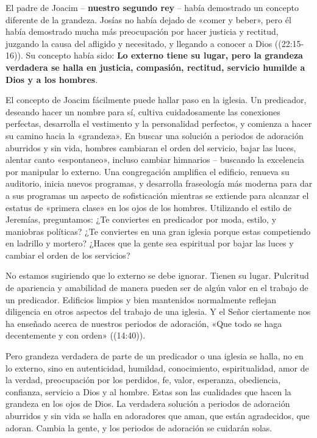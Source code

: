 \documentclass[12pt, twoside, openright]{book}
\begin{document}
El padre de Joacim – \textbf{nuestro segundo rey} – había demostrado un concepto diferente de la grandeza. Josías no había dejado de «comer y beber», pero él había demostrado mucha más preocupación por hacer justicia y rectitud, juzgando la causa del afligido y necesitado, y llegando a conocer a Dios ((22:15-16)). Su concepto había sido: \textbf{Lo externo tiene su lugar, pero la grandeza verdadera se halla en justicia, compasión, rectitud, servicio humilde a Dios y a los hombres}. 

El concepto de Joacim fácilmente puede hallar paso en la iglesia. Un predicador, deseando hacer un nombre para sí, cultiva cuidadosamente las conexiones perfectas, desarrolla el vestimento y la personalidad perfectos, y comienza a hacer su camino hacia la «grandeza». En buscar una solución a periodos de adoración aburridos y sin vida, hombres cambiaran el orden del servicio, bajar las luces, alentar canto «espontaneo», incluso cambiar himnarios – buscando la excelencia por manipular lo externo. Una congregación amplifica el edificio, renueva su auditorio, inicia nuevos programas, y desarrolla fraseología más moderna para dar a sus programas un aspecto de sofisticación mientras se extiende para alcanzar el estatus de «primera clase» en los ojos de los hombres. Utilizando el estilo de Jeremías, preguntamos: ¿Te conviertes en predicador por moda, estilo, y maniobras políticas? ¿Te conviertes en una gran iglesia porque estas competiendo en ladrillo y mortero? ¿Haces que la gente sea espiritual por bajar las luces y cambiar el orden de los servicios?

No estamos sugiriendo que lo externo se debe ignorar. Tienen su lugar. Pulcritud de apariencia y amabilidad de manera pueden ser de algún valor en el trabajo de un predicador. Edificios limpios y bien mantenidos normalmente reflejan diligencia en otros aspectos del trabajo de una iglesia. Y el Señor ciertamente nos ha enseñado acerca de nuestros periodos de adoración, «Que todo se haga decentemente y con orden» ((14:40)). 

Pero grandeza verdadera de parte de un predicador o una iglesia se halla, no en lo externo, sino en autenticidad, humildad, conocimiento, espiritualidad, amor de la verdad, preocupación por los perdidos, fe, valor, esperanza, obediencia, confianza, servicio a Dios y al hombre. Estas son las cualidades que hacen la grandeza en los ojos de Dios. La verdadera solución a periodos de adoración aburridos y sin vida se halla en adoradores que aman, que están agradecidos, que adoran. Cambia la gente, y los periodos de adoración se cuidarán solas.
\end{document}
